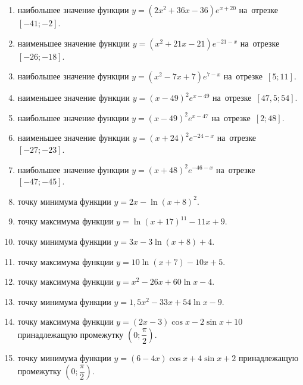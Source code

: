 \documentclass[a4paper,10pt]{article}
\begin{document}
\begin{enumerate}
\item {} наибольшее значение функции $y=\left(2x^2 +36x -36\right)e^{x+20}$ на~отрезке~$\left[-41;-2\right]$.

\item {} наименьшее значение функции $y=\left(x^2 +21x -21\right)e^{-21-x}$ на~отрезке~$\left[-26;-18\right]$.

\item {} наибольшее значение функции $y=\left(x^2 -7x +7\right)e^{7-x}$ на~отрезке~$\left[5;11\right]$.

\item {} наименьшее значение функции $y=\left(x-49\right)^2e^{x-49}$ на~отрезке~$\left[47,5;54\right]$.

\item {} наибольшее значение функции $y=\left(x-49\right)^2e^{x-47}$ на~отрезке~$\left[2;48\right]$.

\item {} наименьшее значение функции $y=\left(x+24\right)^2e^{-24-x}$ на~отрезке~$\left[-27;-23\right]$.

\item {} наибольшее значение функции $y=\left(x+48\right)^2e^{-46-x}$ на~отрезке~$\left[-47;-45\right]$.

\item {} точку минимума функции $y=2x-\ln\left(x+8\right)^{2}$.

\item {} точку максимума функции $y=\ln\left(x+17\right)^{11}-11x+9$.

\item {} точку минимума функции $y=3x-3\ln\left(x+8\right)+4$.

\item {} точку максимума функции $y=10\ln\left(x+7\right)-10x+5$.

\item {} точку максимума функции $y=x^2-26x+60\ln x -4$.

\item {} точку минимума функции $y=1,5x^2-33x+54\ln x -9$.

\item {} точку максимума функции $y=\left(2x-3\right)\cos x -2\sin x+10$
принадлежащую промежутку $\left(0;\dfrac{\pi}{2}\right)$.

\item {} точку минимума функции $y=\left(6-4x\right)\cos x +4\sin x+2$
принадлежащую промежутку $\left(0;\dfrac{\pi}{2}\right)$.


\end{enumerate}
\end{document}

